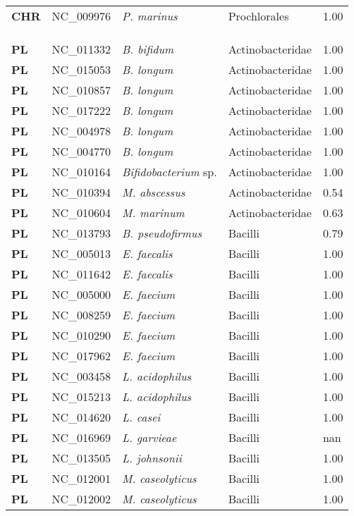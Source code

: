 \begin{adjustwidth}{-3cm}{2cm}
{\begin{supertabular}{>{\bfseries}l|p{0.1\textwidth}p{0.14\textwidth}l|l}
CHR & NC\_009976 & \textit{P. marinus} & Prochlorales & 1.00\\
\\
\\
\hline\\
PL & NC\_011332 & \textit{B. bifidum} & Actinobacteridae & 1.00\\
PL & NC\_015053 & \textit{B. longum} & Actinobacteridae & 1.00\\
PL & NC\_010857 & \textit{B. longum} & Actinobacteridae & 1.00\\
PL & NC\_017222 & \textit{B. longum} & Actinobacteridae & 1.00\\
PL & NC\_004978 & \textit{B. longum} & Actinobacteridae & 1.00\\
PL & NC\_004770 & \textit{B. longum} & Actinobacteridae & 1.00\\
PL & NC\_010164 & \textit{Bifidobacterium} sp. & Actinobacteridae & 1.00\\
PL & NC\_010394 & \textit{M. abscessus} & Actinobacteridae & 0.54\\
PL & NC\_010604 & \textit{M. marinum} & Actinobacteridae & 0.63\\
PL & NC\_013793 & \textit{B. pseudofirmus} & Bacilli & 0.79\\
PL & NC\_005013 & \textit{E. faecalis} & Bacilli & 1.00\\
PL & NC\_011642 & \textit{E. faecalis} & Bacilli & 1.00\\
PL & NC\_005000 & \textit{E. faecium} & Bacilli & 1.00\\
PL & NC\_008259 & \textit{E. faecium} & Bacilli & 1.00\\
PL & NC\_010290 & \textit{E. faecium} & Bacilli & 1.00\\
PL & NC\_017962 & \textit{E. faecium} & Bacilli & 1.00\\
PL & NC\_003458 & \textit{L. acidophilus} & Bacilli & 1.00\\
PL & NC\_015213 & \textit{L. acidophilus} & Bacilli & 1.00\\
PL & NC\_014620 & \textit{L. casei} & Bacilli & 1.00\\
PL & NC\_016969 & \textit{L. garvieae} & Bacilli & nan\\
PL & NC\_013505 & \textit{L. johnsonii} & Bacilli & 1.00\\
PL & NC\_012001 & \textit{M. caseolyticus} & Bacilli & 1.00\\
PL & NC\_012002 & \textit{M. caseolyticus} & Bacilli & 1.00\\

\end{supertabular}}
\end{adjustwidth}
